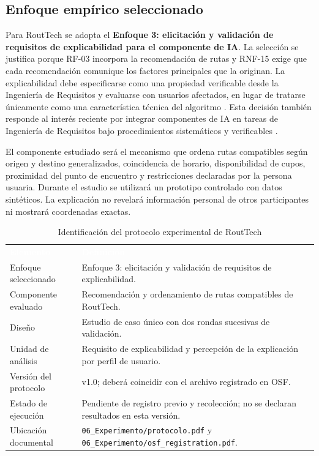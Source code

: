 \documentclass[12pt,a4paper]{article}
\begin{document}
\subsection{Enfoque empírico seleccionado}

Para RoutTech se adopta el \textbf{Enfoque 3: elicitación y validación de requisitos de explicabilidad para el componente de IA}. La selección se justifica porque RF-03 incorpora la recomendación de rutas y RNF-15 exige que cada recomendación comunique los factores principales que la originan. La explicabilidad debe especificarse como una propiedad verificable desde la Ingeniería de Requisitos y evaluarse con usuarios afectados, en lugar de tratarse únicamente como una característica técnica del algoritmo \cite{chazette2020,chazette2021,chazette2022}. Esta decisión también responde al interés reciente por integrar componentes de IA en tareas de Ingeniería de Requisitos bajo procedimientos sistemáticos y verificables \cite{cheng2026,arora2024,vogelsang2024}.

El componente estudiado será el mecanismo que ordena rutas compatibles según origen y destino generalizados, coincidencia de horario, disponibilidad de cupos, proximidad del punto de encuentro y restricciones declaradas por la persona usuaria. Durante el estudio se utilizará un prototipo controlado con datos sintéticos. La explicación no revelará información personal de otros participantes ni mostrará coordenadas exactas.

\begin{table}[H]
\centering
\caption{Identificación del protocolo experimental de RoutTech}
\label{tab:identificacion-protocolo}
\small
{}
\begin{tabularx}{\textwidth}{L{4.15cm} Y}
\textcolor{white}{\textbf{Elemento}} &
\textcolor{white}{\textbf{Definición}}\\
Enfoque seleccionado & Enfoque 3: elicitación y validación de requisitos de explicabilidad.\\
Componente evaluado & Recomendación y ordenamiento de rutas compatibles de RoutTech.\\
Diseño & Estudio de caso único con dos rondas sucesivas de validación.\\
Unidad de análisis & Requisito de explicabilidad y percepción de la explicación por perfil de usuario.\\
Versión del protocolo & v1.0; deberá coincidir con el archivo registrado en OSF.\\
Estado de ejecución & Pendiente de registro previo y recolección; no se declaran resultados en esta versión.\\
Ubicación documental & \nolinkurl{06_Experimento/protocolo.pdf} y \nolinkurl{06_Experimento/osf_registration.pdf}.\\
\end{tabularx}
\end{table}
\end{document}
